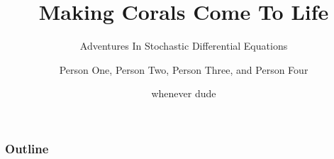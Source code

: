 \documentclass{beamer}
\begin{document}
\author{Person One, Person Two, Person Three, and Person Four}

\title{Making Corals Come To Life}
\subtitle{Adventures In Stochastic Differential Equations}
\date{whenever dude}

\begin{frame}
  \titlepage
\end{frame}

\begin{frame}
  \frametitle{Outline}
  \tableofcontents
\end{frame}





\end{document}

